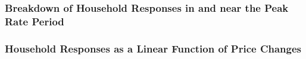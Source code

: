 \subsubsection{Breakdown of Household Responses in and near the Peak Rate Period}
\label{Sub-subsection:Breakdown-of-Household-Responses-in-and-near-the-Peak-Rate-Period}



\subsubsection{Household Responses as a Linear Function of Price Changes}
\label{Sub-subsection:Household-Responses-as-a-Linear-Function-of-Price-Changes}


